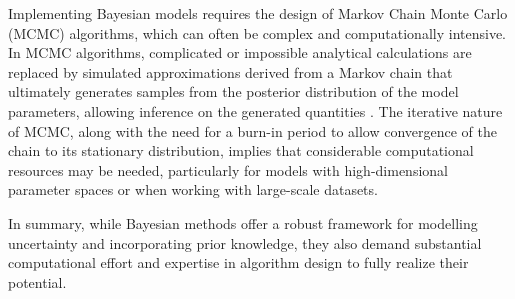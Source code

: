 \documentclass[12pt,	%
	a4paper,		%
	twoside,		%
	openright,		%
	titlepage,%
	]{book}
\theoremstyle{definition}
\let\cite\citep
\begin{document}
Implementing Bayesian models requires the design of Markov Chain Monte Carlo (MCMC) algorithms, which can often be complex and computationally intensive. In MCMC algorithms, complicated or impossible analytical calculations are replaced by simulated approximations \cite{paper-36} derived from a Markov chain that ultimately generates samples from the posterior distribution of the model parameters, allowing inference on the generated quantities \cite{gelman-bayesian} \cite{mcmcm-stat-methods}. The iterative nature of MCMC, along with the need for a burn-in period to allow convergence of the chain to its stationary distribution, implies that considerable computational resources may be needed, particularly for models with high-dimensional parameter spaces or when working with large-scale datasets.

In summary, while Bayesian methods offer a robust framework for modelling uncertainty and incorporating prior knowledge, they also demand substantial computational effort and expertise in algorithm design to fully realize their potential.
\end{document}
